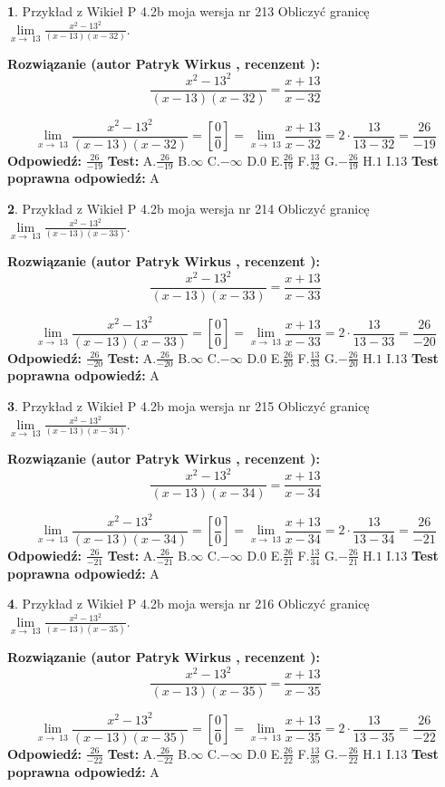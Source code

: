 \documentclass[12pt, a4paper]{article}
\theoremstyle{definition} %
\newtheorem{zad}{}
\newcommand{\zadStart}[1]{\begin{zad}#1\newline}
\newcommand{\zadStop}{\end{zad}}
\newcommand{\rozwStart}[2]{\noindent \textbf{Rozwiązanie (autor #1 , recenzent #2): }\newline}
\newcommand{\rozwStop}{\newline}
\newcommand{\odpStart}{\noindent \textbf{Odpowiedź:}\newline}
\newcommand{\odpStop}{\newline}
\newcommand{\testStart}{\noindent \textbf{Test:}\newline}
\newcommand{\testStop}{\newline}
\newcommand{\kluczStart}{\noindent \textbf{Test poprawna odpowiedź:}\newline}
\newcommand{\kluczStop}{\newline}
\begin{document}
\zadStart{Przykład z Wikieł P 4.2b moja wersja nr 213}
Obliczyć granicę $\lim\limits_{x\to\ 13}\frac{x^{2}-13^{2}}{(x-13)(x-32)}$.
\zadStop
\rozwStart{Patryk Wirkus}{}
$$\frac{x^{2}-13^{2}}{(x-13)(x-32)}=\frac{x+13}{x-32}$$

$$\lim\limits_{x\to\ 13}\frac{x^{2}-13^{2}}{(x-13)(x-32)}=[\frac{0}{0}]=\lim\limits_{x\to\ 13}\frac{x+13}{x-32}=2 \cdot \frac{13}{13-32} = \frac{26}{-19}$$
\rozwStop
\odpStart
$\frac{26}{-19}$
\odpStop
\testStart
A.$\frac{26}{-19}$
B.$\infty$
C.$-\infty$
D.$0$
E.$\frac{26}{19}$
F.$\frac{13}{32}$
G.$-\frac{26}{19}$
H.$1$
I.$13$
\testStop
\kluczStart
A
\kluczStop



\zadStart{Przykład z Wikieł P 4.2b moja wersja nr 214}
Obliczyć granicę $\lim\limits_{x\to\ 13}\frac{x^{2}-13^{2}}{(x-13)(x-33)}$.
\zadStop
\rozwStart{Patryk Wirkus}{}
$$\frac{x^{2}-13^{2}}{(x-13)(x-33)}=\frac{x+13}{x-33}$$

$$\lim\limits_{x\to\ 13}\frac{x^{2}-13^{2}}{(x-13)(x-33)}=[\frac{0}{0}]=\lim\limits_{x\to\ 13}\frac{x+13}{x-33}=2 \cdot \frac{13}{13-33} = \frac{26}{-20}$$
\rozwStop
\odpStart
$\frac{26}{-20}$
\odpStop
\testStart
A.$\frac{26}{-20}$
B.$\infty$
C.$-\infty$
D.$0$
E.$\frac{26}{20}$
F.$\frac{13}{33}$
G.$-\frac{26}{20}$
H.$1$
I.$13$
\testStop
\kluczStart
A
\kluczStop



\zadStart{Przykład z Wikieł P 4.2b moja wersja nr 215}
Obliczyć granicę $\lim\limits_{x\to\ 13}\frac{x^{2}-13^{2}}{(x-13)(x-34)}$.
\zadStop
\rozwStart{Patryk Wirkus}{}
$$\frac{x^{2}-13^{2}}{(x-13)(x-34)}=\frac{x+13}{x-34}$$

$$\lim\limits_{x\to\ 13}\frac{x^{2}-13^{2}}{(x-13)(x-34)}=[\frac{0}{0}]=\lim\limits_{x\to\ 13}\frac{x+13}{x-34}=2 \cdot \frac{13}{13-34} = \frac{26}{-21}$$
\rozwStop
\odpStart
$\frac{26}{-21}$
\odpStop
\testStart
A.$\frac{26}{-21}$
B.$\infty$
C.$-\infty$
D.$0$
E.$\frac{26}{21}$
F.$\frac{13}{34}$
G.$-\frac{26}{21}$
H.$1$
I.$13$
\testStop
\kluczStart
A
\kluczStop



\zadStart{Przykład z Wikieł P 4.2b moja wersja nr 216}
Obliczyć granicę $\lim\limits_{x\to\ 13}\frac{x^{2}-13^{2}}{(x-13)(x-35)}$.
\zadStop
\rozwStart{Patryk Wirkus}{}
$$\frac{x^{2}-13^{2}}{(x-13)(x-35)}=\frac{x+13}{x-35}$$

$$\lim\limits_{x\to\ 13}\frac{x^{2}-13^{2}}{(x-13)(x-35)}=[\frac{0}{0}]=\lim\limits_{x\to\ 13}\frac{x+13}{x-35}=2 \cdot \frac{13}{13-35} = \frac{26}{-22}$$
\rozwStop
\odpStart
$\frac{26}{-22}$
\odpStop
\testStart
A.$\frac{26}{-22}$
B.$\infty$
C.$-\infty$
D.$0$
E.$\frac{26}{22}$
F.$\frac{13}{35}$
G.$-\frac{26}{22}$
H.$1$
I.$13$
\testStop
\kluczStart
A
\kluczStop
\end{document}
